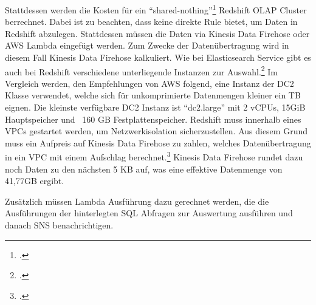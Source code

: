 Stattdessen werden die Kosten für ein \enquote{shared-nothing}\footcite[Vgl.][2172]{Tan.2019} Redshift \ac{OLAP} Cluster berrechnet. Dabei ist zu beachten, dass \AWSIOT{} keine direkte Rule bietet, um Daten in Redshift abzulegen. Stattdessen müssen die Daten via Kinesis Data Firehose oder \ac{AWS} Lambda eingefügt werden. Zum Zwecke der Datenübertragung wird in diesem Fall Kinesis Data Firehose kalkuliert. Wie bei Elasticsearch Service gibt es auch bei Redshift verschiedene unterliegende Instanzen zur Auswahl.\footcite[Vgl. auch im Folgenden][]{AmazonWebServicesInc..o.J.z} Im Vergleich werden, den Empfehlungen von \ac{AWS} folgend, eine Instanz der \ac{DC2} Klasse verwendet, welche sich für unkomprimierte Datenmengen kleiner ein TB eignen. Die kleinste verfügbare \ac{DC2} Instanz ist \enquote{dc2.large} mit 2 vCPUs, 15GiB Hauptspeicher und ~160 GB Festplattenspeicher. Redshift muss innerhalb eines \acp{VPC} gestartet werden, um Netzwerkisolation sicherzustellen. Aus diesem Grund muss ein Aufpreis auf Kinesis Data Firehose zu zahlen, welches Datenübertragung in ein \ac{VPC} mit einem Aufschlag berechnet.\footcite[Vgl. auch im Folgenden][]{AmazonWebServicesInc..o.J.y} Kinesis Data Firehose rundet dazu noch Daten zu den nächsten 5 KB auf, was eine effektive Datenmenge von 41,77GB ergibt.

Zusätzlich müssen Lambda Ausführung dazu gerechnet werden, die die Ausführungen der hinterlegten \ac{SQL} Abfragen zur Auswertung ausführen und danach \ac{SNS} benachrichtigen.

